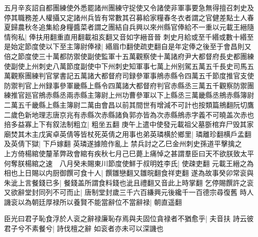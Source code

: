 五月辛亥詔自都團練使外悉罷諸州團練守捉使又令諸使非軍事要急無得擅召刺史及停其職務差人權攝又定諸州兵皆有常數其召募給家糧春冬衣者謂之官健差點土人春夏歸農秋冬追集給身糧醬菜者謂之團結自兵興以來州縣官俸給不一重以元載王縉隨情徇私|{
	俸扶用翻重直用翻載祖亥翻又音如字縉音晉}
刺史月給或至千緡或數十緡至是始定節度使以下至主簿尉俸禄|{
	緡眉巾翻使疏吏翻自是年定俸之後至于會昌則又倍之節度使三十萬都防禦使副使監軍十五萬觀察使十萬諸府尹大都督府長史都團練使副使上州刺史八萬節度副使中下州刺史知軍事七萬上州别駕五萬五千長史司馬五萬觀察團練判官掌書記五萬諸大都督府司録參軍事鴘赤縣令四萬五千節度推官支使防禦判官上州録事參軍畿縣上縣令四萬諸大都督府判官赤縣丞三萬五千觀察防禦團練推官廵官鴘赤縣丞兩赤縣主簿尉上州功曹參軍以下上縣丞三萬畿縣丞鴘赤縣簿尉二萬五千畿縣上縣主簿尉二萬由會昌以前其間世有增減不可計也按類篇鴘翻阮切鷹二歲色新地理志唐京兆有赤縣次赤縣諸負郭亦皆為次赤縣鴘赤字義不可曉盖次赤也}
掊多益寡上下有叙法制粗立|{
	粗坐五翻}
庚午上遣中使發元載祖父墓斵棺弃尸毁其家廟焚其木主戊寅卓英倩等皆杖死英倩之用事也弟英璘横於鄉里|{
	璘離珍翻横戶孟翻}
及英倩下獄|{
	下戶嫁翻}
英璘遂據險作亂上禁兵討之乙巳金州刺史孫道平擊擒之　上方倚楊綰使釐革弊政會綰有疾秋七月己巳薨上痛悼之甚謂羣臣曰天不欲朕致太平何奪朕楊綰之速　八月癸未賜東川節度使鮮于叔明姓李氏|{
	使疎吏翻}
元載王縉之為相也上日賜以内厨御饌可食十人|{
	饌雛戀翻又雛晥翻食祥吏翻}
遂為故事癸卯常衮與朱泚上言餐錢已多|{
	餐錢盖所謂食料錢也泚且禮翻又音此上時掌翻}
乞停賜饌許之衮又欲辭堂封同列不可而止|{
	唐制堂封歲三千六百縑興元後纔千一百德宗尋復舊}
時人譏衮以為朝廷厚禄所以養賢不能當辭位不當辭禄|{
	朝直遥翻}


臣光曰君子恥食浮於人衮之辭禄廉恥存焉與夫固位貪禄者不猶愈乎|{
	夫音扶}
詩云彼君子兮不素餐兮|{
	詩伐檀之辭}
如衮者亦未可以深譏也

